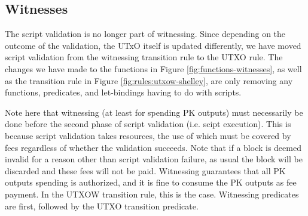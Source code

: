 \clearpage


\subsection{Witnesses}
\label{sec:witnesses-shelley}

The script validation is no longer part of witnessing. Since depending on
the outcome of the validation, the UTxO itself is updated differently, we
have moved script validation from the witnessing transition rule to
the UTXO rule. The changes we have made to the functions in Figure
\ref{fig:functions-witnesses}, as well as the transition rule in Figure
\ref{fig:rules:utxow-shelley}, are only removing any
functions, predicates, and let-bindings having to do with scripts.

Note here that witnessing (at least for spending PK outputs) must necessarily
be done before the second phase of script validation (i.e. scipt execution).
This is because script validation takes resources, the use of which must
be covered by fees regardless of whether the validation succeeds.
Note that if a block is deemed invalid for a reason other than
script validation failure, as usual the block will be discarded and
these fees will not be paid. Witnessing
guarantees that all PK outputs spending is authorized, and it is fine to
consume the PK outputs as fee payment. In the UTXOW transition rule,
this is the case. Witnessing predicates are first, followed by the UTXO transition
predicate.

